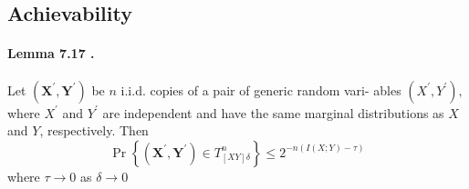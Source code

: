 \documentclass[8pt]{article}
\begin{document}
\newpage
\subsection{Achievability}

\begin{tcolorbox}
\paragraph{Lemma 7.17 .} Let $\left(\mathbf{X}^{\prime}, \mathbf{Y}^{\prime}\right)$ be $n$ i.i.d. copies of a pair of generic random vari-
ables $\left(X^{\prime}, Y^{\prime}\right),$ where $X^{\prime}$ and $Y^{\prime}$ are independent and have the same marginal distributions as $X$ and $Y$, respectively. Then
$$
\operatorname{Pr}\left\{\left(\mathbf{X}^{\prime}, \mathbf{Y}^{\prime}\right) \in T_{[X Y] \delta}^{n}\right\} \leq 2^{-n(I(X ; Y)-\tau)}
$$
where $\tau \rightarrow 0$ as $\delta \rightarrow 0$
\end{tcolorbox}
\end{document}
